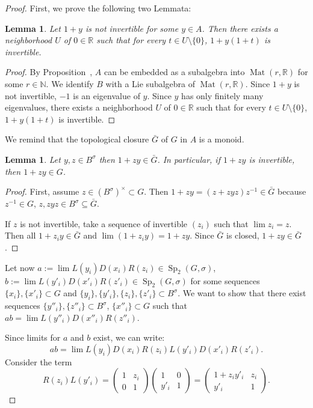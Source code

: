 \documentclass[a4paper,oneside,11pt]{amsart}
\DeclareMathOperator{\Mat}{Mat}
\DeclareMathOperator{\Sp}{Sp}
\newcommand{\R}{\mathbb R}
\newcommand{\N}{\mathbb N}
\theoremstyle{plain}
\newtheorem{lem}[teo]{Lemma}
\theoremstyle{definition}
\theoremstyle{remark}
\newcommand{\bs}{\setminus}
\begin{document}
\begin{proof} First, we prove the following two Lemmata:

\begin{lem}\label{invert_1+y}
Let $1+y$ is not invertible for some $y\in A$. Then there exists a neighborhood $U$ of $0\in\R$ such that for every $t\in U\bs\{0\}$, $1+y(1+t)$ is invertible.
\end{lem}

\begin{proof}
By Proposition~\cite[Proposition~2.24]{ABRRW}, $A$ can be embedded as a subalgebra into $\Mat(r,\R)$ for some $r\in \N$. We identify $B$ with a Lie subalgebra of $\Mat(r,\R)$. Since $1+y$ is not invertible, $-1$ is an eigenvalue of $y$. Since $y$ has only finitely many eigenvalues, there exists a neighborhood $U$ of $0\in\R$ such that for every $t\in U\bs\{0\}$, $1+y(1+t)$ is invertible.
\end{proof}

We remind that the topological closure $\bar G$ of $G$ in $A$  is a monoid.

\begin{lem}\label{zy-invert}
Let $y,z\in B^{\sigma}$ then $1+zy\in \bar G$. In particular, if $1+zy$ is invertible, then $1+zy\in G$.
\end{lem}

\begin{proof}
First, assume $z\in (B^{\sigma})^\times\subset G$. Then $1+zy=(z+zyz)z^{-1}\in \bar G$ because $z^{-1}\in G$, $z,zyz\in B^{\sigma}\subseteq\bar G$.

If $z$ is not invertible, take a sequence of invertible $(z_i)$ such that $\lim z_i=z$. Then all $1+z_iy\in \bar G$ and $\lim(1+z_iy)=1+zy$. Since $\bar G$ is closed, $1+zy\in \bar G$.
\end{proof}




Let now $a:=\lim L(y_i)D(x_i)R(z_i)\in\Sp_2(G,\sigma)$, $b:=\lim L(y'_i)D(x'_i)R(z'_i)\in\Sp_2(G,\sigma)$ for some sequences $\{x_i\},\{x'_i\}\subset G$ and $\{y_i\},\{y'_i\},\{z_i\},\{z'_i\}\subset B^{\sigma}$. We want to show that there exist sequences $\{y''_i\},\{z''_i\}\subset B^{\sigma}$, $\{x''_i\}\subset G$ such that $ab=\lim L(y''_i)D(x''_i)R(z''_i)$.

Since limits for $a$ and $b$ exist, we can write:
$$ab=\lim L(y_i)D(x_i)R(z_i)L(y'_i)D(x'_i)R(z'_i).$$
Consider the term
$$R(z_i)L(y'_i)=\begin{pmatrix}
    1 & z_i \\
    0 & 1
    \end{pmatrix}
    \begin{pmatrix}
    1 & 0 \\
    y'_i & 1
    \end{pmatrix}=
    \begin{pmatrix}
    1+z_iy'_i & z_i \\
    y'_i & 1
    \end{pmatrix}.$$


\end{proof}
\end{document}
